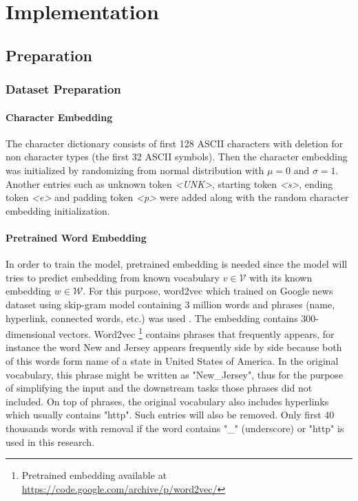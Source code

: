 \chapter{Implementation}
\label{chap:implementation}

\section{Preparation}
    \subsection{Dataset Preparation}
        \subsubsection{Character Embedding}
            The character dictionary consists of first 128 ASCII
            characters with deletion for non character types (the
            first 32 ASCII symbols). Then the character embedding was
            initialized by randomizing from normal distribution with
            $\mu = 0$ and $\sigma = 1$. Another entries such as
            unknown token \textit{\textless UNK\textgreater}, starting
            token \textit{\textless s\textgreater}, ending token
            \textit{\textless e\textgreater} and padding token
            \textit{\textless p\textgreater} were added along with the
            random character embedding initialization.

        \subsubsection{Pretrained Word Embedding}
            In order to train the model, pretrained embedding is
            needed since the model will tries to predict embedding
            from known vocabulary $v \in \mathcal{V}$ with its known
            embedding $w \in \mathcal{W}$. For this purpose, word2vec
            which trained on Google news dataset using skip-gram model
            containing 3 million words and phrases (name, hyperlink,
            connected words, etc.) was used
            \citep{Distributed2013mikolov}. The embedding contains
            300-dimensional vectors. Word2vec \footnote{Pretrained
            embedding available at 
            \url{https://code.google.com/archive/p/word2vec/}}
            contains phrases that frequently appears, for instance the
            word New and Jersey appears frequently side by side
            because both of this words form name of a state in United
            States of America. In the original vocabulary, this phrase
            might be written as "New\_Jersey", thus for the purpose of
            simplifying the input and the downstream tasks those
            phrases did not included. On top of phrases, the original
            vocabulary also includes hyperlinks which usually contains
            "http". Such entries will also be removed. Only first 40
            thousands words with removal if the word contains "\_"
            (underscore) or "http" is used in this research.
            
